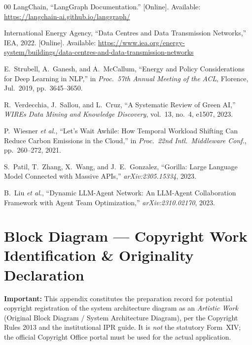 ﻿\documentclass[conference]{IEEEtran}
\begin{document}
\begin{thebibliography}{00}
LangChain, ``LangGraph Documentation.'' [Online]. Available:
\url{https://langchain-ai.github.io/langgraph/}

International Energy Agency, ``Data Centres and Data Transmission Networks,''
IEA, 2022. [Online]. Available:
\url{https://www.iea.org/energy-system/buildings/data-centres-and-data-transmission-networks}

E.~Strubell, A.~Ganesh, and A.~McCallum, ``Energy and Policy Considerations for
Deep Learning in NLP,'' in \textit{Proc.\ 57th Annual Meeting of the ACL},
Florence, Jul.\ 2019, pp.\ 3645--3650.

R.~Verdecchia, J.~Sallou, and L.~Cruz, ``A Systematic Review of Green AI,''
\textit{WIREs Data Mining and Knowledge Discovery}, vol.~13, no.~4, e1507, 2023.

P.~Wiesner \textit{et al.}, ``Let's Wait Awhile: How Temporal Workload Shifting Can
Reduce Carbon Emissions in the Cloud,'' in \textit{Proc.\ 22nd Intl.\ Middleware
Conf.}, pp.\ 260--272, 2021.

S.~Patil, T.~Zhang, X.~Wang, and J.~E.~Gonzalez, ``Gorilla: Large Language Model
Connected with Massive APIs,'' \textit{arXiv:2305.15334}, 2023.

B.~Liu \textit{et al.}, ``Dynamic LLM-Agent Network: An LLM-Agent Collaboration
Framework with Agent Team Optimization,'' \textit{arXiv:2310.02170}, 2023.

\end{thebibliography}

\appendix
\section{Block Diagram --- Copyright Work Identification \& Originality Declaration}
\label{app:blockdiag}

\noindent\textbf{Important:} This appendix constitutes the preparation record for
potential copyright registration of the system architecture diagram as an
\emph{Artistic Work} (Original Block Diagram / System Architecture Diagram),
per the Copyright Rules 2013 and the institutional IPR guide.
It is \emph{not} the statutory Form~XIV; the official Copyright Office portal
must be used for the actual application.
\end{document}
